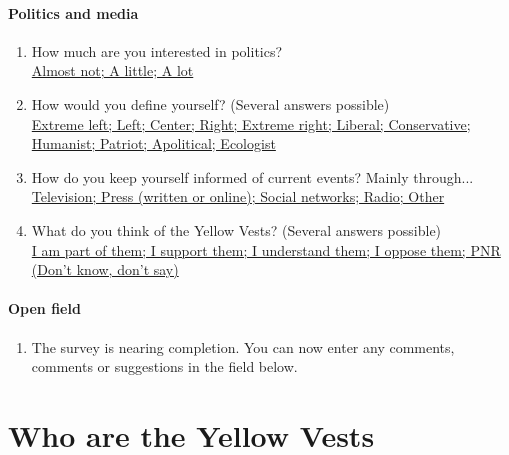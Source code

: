\documentclass[english,5p,authoryear]{elsarticle}
\begin{document}
\begin{appendices}
\paragraph{Politics and media}
\begin{enumerate}[resume,leftmargin=*]
\item How much are you interested in politics? \uline{}\\
\uline{Almost not; A little; A lot }
\item How would you define yourself? (Several answers possible) \uline{}\\
\uline{Extreme left; Left; Center; Right; Extreme right; Liberal; Conservative;
Humanist; Patriot; Apolitical; Ecologist }
\item How do you keep yourself informed of current events? Mainly through...
\uline{}\\
\uline{Television; Press (written or online); Social networks; Radio;
Other}
\item What do you think of the Yellow Vests? (Several answers possible)
\uline{}\\
\uline{I am part of them; I support them; I understand them; I oppose
them; PNR (Don't know, don't say) }
\end{enumerate}

\paragraph{Open field}
\begin{enumerate}[resume,leftmargin=*]
\item The survey is nearing completion. You can now enter any comments,
comments or suggestions in the field below.
\end{enumerate}



\section{Who are the Yellow Vests\label{app:stats_des}}



\end{appendices}
\end{document}
